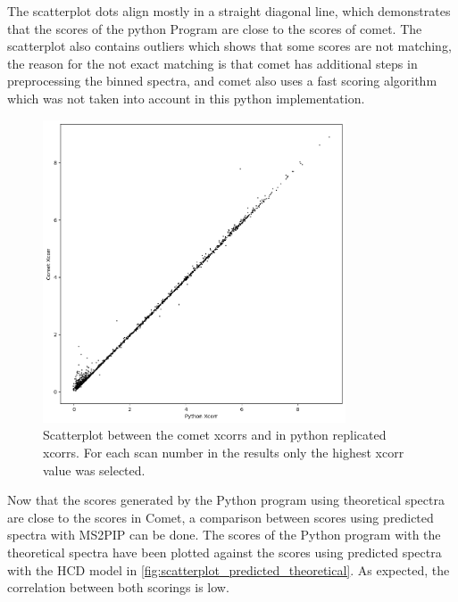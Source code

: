 \documentclass[11pt]{article}
\begin{document}
The scatterplot dots align mostly in a straight diagonal line, which demonstrates that the scores of the python Program are close to the scores of comet. The scatterplot also contains outliers which shows that some scores are not matching, the reason for the not exact matching is that comet has additional steps in preprocessing the binned spectra, and comet also uses a fast scoring algorithm which was not taken into account in this python implementation. 
\begin{figure}[ht]
\centering
\includegraphics[width=0.8\textwidth]{figs/scatterplot.png}
\caption{Scatterplot between the comet xcorrs and in python replicated xcorrs. For each scan number in the results only the highest xcorr value was selected.}
\label{fig:scatterplot}
\end{figure}

Now that the scores generated by the Python program using theoretical spectra are close to the scores in Comet, a comparison between scores using predicted spectra with MS2PIP can be done. The scores of the Python program with the theoretical spectra have been plotted against the scores using predicted spectra with the HCD model in \cref{fig:scatterplot_predicted_theoretical}. As expected, the correlation between both scorings is low. 
\end{document}
